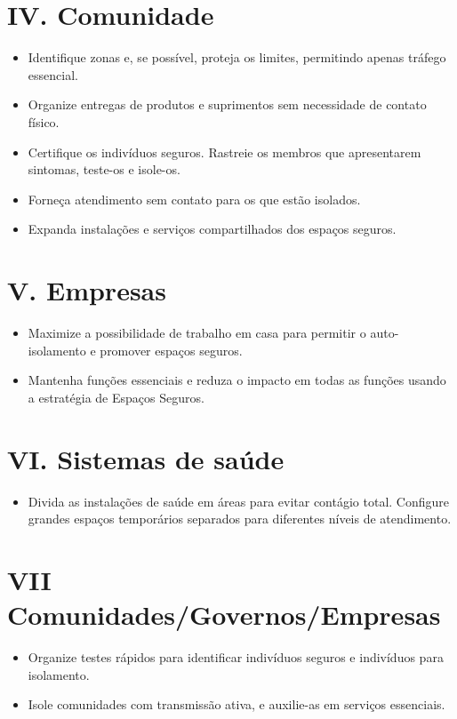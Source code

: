 \documentclass[onecolumn,journal]{IEEEtran}
\begin{document}
\begin{multicols}{2}
\section*{IV. Comunidade}
\begin{itemize}
\item Identifique zonas e, se possível, proteja os limites, permitindo apenas tráfego essencial.
\item Organize entregas de produtos e suprimentos sem necessidade de contato físico.
\item Certifique os indivíduos seguros. Rastreie os membros que apresentarem sintomas, teste-os e isole-os.
\item Forneça atendimento sem contato para os que estão isolados.
\item Expanda instalações e serviços compartilhados dos espaços seguros.
\end{itemize}

\section*{V. Empresas}
\begin{itemize}
\item Maximize a possibilidade de trabalho em casa para permitir o auto-isolamento e promover espaços seguros.
\item Mantenha funções essenciais e reduza o impacto em todas as funções usando a estratégia de Espaços Seguros.
\end{itemize}

\section*{VI. Sistemas de saúde}
\begin{itemize}
\item Divida as instalações de saúde em áreas para evitar contágio total. Configure grandes espaços temporários separados para diferentes níveis de atendimento.
\end{itemize}

\section*{VII Comunidades/Governos/Empresas}
\begin{itemize}
\item Organize testes rápidos para identificar indivíduos seguros e indivíduos para isolamento.
\item Isole comunidades com transmissão ativa, e auxilie-as em serviços essenciais.
\end{itemize}


\end{multicols}



% 
\end{document}
